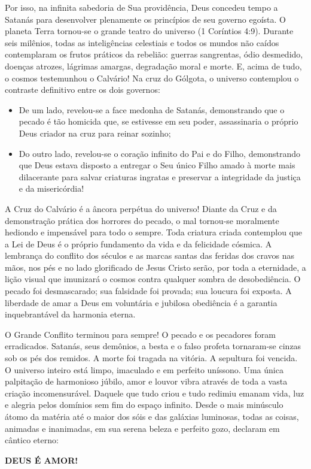 Por isso, na infinita sabedoria de Sua providência, Deus concedeu tempo a Satanás para desenvolver plenamente os princípios de seu governo egoísta. O planeta Terra tornou-se o grande teatro do universo (1 Coríntios 4:9).
Durante seis milênios, todas as inteligências celestiais e todos os mundos não caídos contemplaram os frutos práticos da rebelião: guerras sangrentas, ódio desmedido, doenças atrozes, lágrimas amargas, degradação moral e morte.
E, acima de tudo, o cosmos testemunhou o Calvário! Na cruz do Gólgota, o universo contemplou o contraste definitivo entre os dois governos:
\begin{itemize}
  \item De um lado, revelou-se a face medonha de Satanás, demonstrando que o pecado é tão homicida que, se estivesse em seu poder, assassinaria o próprio Deus criador na cruz para reinar sozinho;
  \item Do outro lado, revelou-se o coração infinito do Pai e do Filho, demonstrando que Deus estava disposto a entregar o Seu único Filho amado à morte mais dilacerante para salvar criaturas ingratas e preservar a integridade da justiça e da misericórdia!
\end{itemize}


A Cruz do Calvário é a âncora perpétua do universo!
Diante da Cruz e da demonstração prática dos horrores do pecado, o mal tornou-se moralmente hediondo e impensável para todo o sempre. Toda criatura criada contemplou que a Lei de Deus é o próprio fundamento da vida e da felicidade cósmica. A lembrança do conflito dos séculos e as marcas santas das feridas dos cravos nas mãos, nos pés e no lado glorificado de Jesus Cristo serão, por toda a eternidade, a lição visual que imunizará o cosmos contra qualquer sombra de desobediência. O pecado foi desmascarado; sua falsidade foi provada; sua loucura foi exposta. A liberdade de amar a Deus em voluntária e jubilosa obediência é a garantia inquebrantável da harmonia eterna.

O Grande Conflito terminou para sempre!
O pecado e os pecadores foram erradicados.
Satanás, seus demônios, a besta e o falso profeta tornaram-se cinzas sob os pés dos remidos.
A morte foi tragada na vitória.
A sepultura foi vencida.
O universo inteiro está limpo, imaculado e em perfeito uníssono.
Uma única palpitação de harmonioso júbilo, amor e louvor vibra através de toda a vasta criação incomensurável.
Daquele que tudo criou e tudo redimiu emanam vida, luz e alegria pelos domínios sem fim do espaço infinito.
Desde o mais minúsculo átomo da matéria até o maior dos sóis e das galáxias luminosas, todas as coisas, animadas e inanimadas, em sua serena beleza e perfeito gozo, declaram em cântico eterno:

\textbf{DEUS É AMOR!}